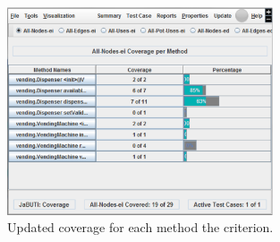 
\begin{figure}[!ht]
\begin{center}
\includegraphics[width=0.70\textwidth]{fig/summary-by-method-tc1.eps}
\caption{\label{fig:summary-method-input1} Updated coverage for
each method \wrt the  criterion.}
\end{center}
\end{figure}
